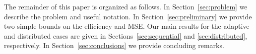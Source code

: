 The remainder of this paper is organized as follows. In Section~\ref{sec:problem} we describe the problem and useful notation. In Section~\ref{sec:preliminary} we provide two simple bounds on the efficiency and MSE. Our main results for the adaptive and distributed cases are given in Sections~\ref{sec:sequential} and \ref{sec:distributed}, respectively. In Section~\ref{sec:conclusions} we provide concluding remarks. 
